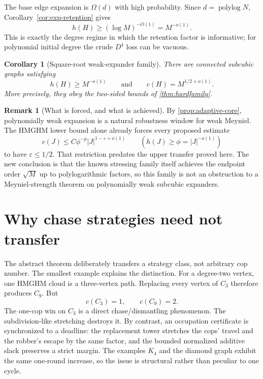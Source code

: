 \documentclass[11pt]{amsart}
\newtheorem{corollary}[theorem]{Corollary}
\theoremstyle{definition}
\newtheorem{remark}[theorem]{Remark}
\newcommand{\cnum}{c}
\newcommand{\eps}{\varepsilon}
\begin{document}
The base edge expansion is $\Omega(d)$ with high probability.  Since
$d=\operatorname{polylog}N$, Corollary~\ref{cor:exp-retention} gives
\[
 h(H)\ge (\log M)^{-O(1)}=M^{-o(1)}.
\]
This is exactly the degree regime in which the retention factor is
informative; for polynomial initial degree the crude $D^4$ loss can be
vacuous.

\begin{corollary}[Square-root weak-expander family]\label{cor:weakexpander}
There are connected subcubic graphs satisfying
\[
 h(H)\ge M^{-o(1)}
 \qquad\text{and}\qquad
 \cnum(H)=M^{1/2+o(1)}.
\]
More precisely, they obey the two-sided bounds of
\cref{thm:hardfamily}.
\end{corollary}

\begin{remark}[What is forced, and what is achieved]\label{rem:robustness-endpoint}
By \cref{prop:adaptive-core}, polynomially weak expansion is a natural
robustness window for weak Meyniel.  The HMGHM lower bound alone already
forces every proposed estimate
\[
 \cnum(J)\le C\phi^{-p}|J|^{1-\eps+o(1)}
 \qquad(h(J)\ge\phi=|J|^{-o(1)})
\]
to have $\eps\le1/2$.  That restriction predates the upper transfer proved
here.  The new conclusion is that the known stressing family itself achieves
the endpoint order $\sqrt M$ up to polylogarithmic factors, so this family is
not an obstruction to a Meyniel-strength theorem on polynomially weak
subcubic expanders.
\end{remark}

\section{Why chase strategies need not transfer}

The abstract theorem deliberately transfers a strategy class, not arbitrary
cop number.  The smallest example explains the distinction.  For a degree-two
vertex, one HMGHM cloud is a three-vertex path.  Replacing every vertex of
$C_3$ therefore produces $C_9$.  But
\[
 \cnum(C_3)=1,
 \qquad
 \cnum(C_9)=2.
\]
The one-cop win on $C_3$ is a direct chase/dismantling phenomenon.  The
subdivision-like stretching destroys it.  By contrast, an occupation
certificate is synchronized to a deadline: the replacement tower stretches
the cops' travel and the robber's escape by the same factor, and the bounded
normalized additive slack preserves a strict margin.  The examples
$K_4$ and the diamond graph exhibit the same one-round increase, so the issue
is structural rather than peculiar to one cycle.
\end{document}
